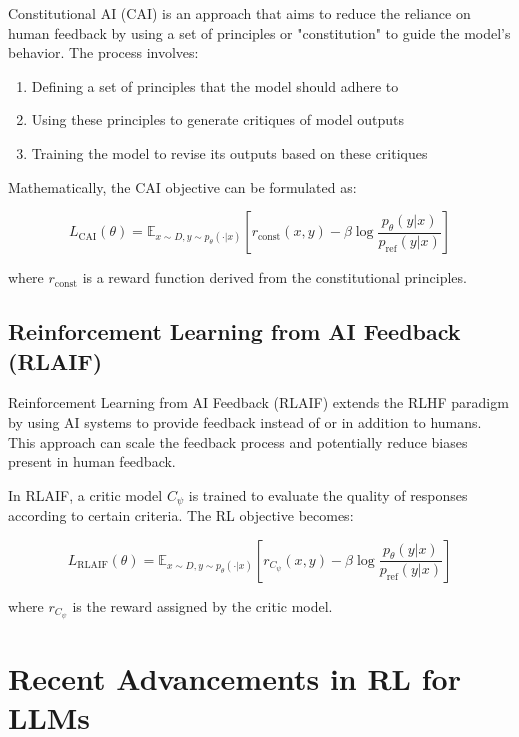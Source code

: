 \documentclass{article}
\begin{document}
Constitutional AI (CAI) is an approach that aims to reduce the reliance on human feedback by using a set of principles or "constitution" to guide the model's behavior. The process involves:

\begin{enumerate}
    \item Defining a set of principles that the model should adhere to
    \item Using these principles to generate critiques of model outputs
    \item Training the model to revise its outputs based on these critiques
\end{enumerate}

Mathematically, the CAI objective can be formulated as:

\begin{equation}
L_{\text{CAI}}(\theta) = \mathbb{E}_{x \sim D, y \sim p_{\theta}(\cdot|x)}\left[r_{\text{const}}(x, y) - \beta \log\frac{p_{\theta}(y|x)}{p_{\text{ref}}(y|x)}\right]
\end{equation}

where $r_{\text{const}}$ is a reward function derived from the constitutional principles.

\subsection{Reinforcement Learning from AI Feedback (RLAIF)}

Reinforcement Learning from AI Feedback (RLAIF) extends the RLHF paradigm by using AI systems to provide feedback instead of or in addition to humans. This approach can scale the feedback process and potentially reduce biases present in human feedback.

In RLAIF, a critic model $C_\psi$ is trained to evaluate the quality of responses according to certain criteria. The RL objective becomes:

\begin{equation}
L_{\text{RLAIF}}(\theta) = \mathbb{E}_{x \sim D, y \sim p_{\theta}(\cdot|x)}\left[r_{C_\psi}(x, y) - \beta \log\frac{p_{\theta}(y|x)}{p_{\text{ref}}(y|x)}\right]
\end{equation}

where $r_{C_\psi}$ is the reward assigned by the critic model.

\section{Recent Advancements in RL for LLMs}
\end{document}
